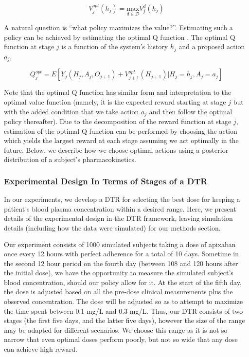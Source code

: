 \begin{equation}
V^{opt}_j(h_j) = \underset{d \in \mathscr{D}}{\mbox{max}} V^d_j(h_j)
\end{equation}

\noindent A natural question is “what policy maximizes the value?”. Estimating such a policy can be achieved by estimating the optimal Q function \cite{chakraborty2013statistical}.  The optimal Q function at stage $ j $ is a function of the system’s history $ h_j $ and a proposed action $ a_j $,

\begin{equation}
 Q_j^{opt} = E \left[ 
 Y_j(H_j, A_j, O_{j+1}) + V^{opt}_{j+1}(H_{j+1}) \lvert H_j = h_j, A_j = a_j
 \right]
\end{equation}

Note that the optimal Q function has similar form and interpretation to the optimal value function (namely, it is the expected reward starting at stage $ j $ but with the added condition that we take action $ a_j $ and then follow the optimal policy thereafter). Due to the decomposition of the reward function at stage $ j $, estimation of the optimal Q function can be performed by choosing the action which yields the largest reward at each stage assuming we act optimally in the future.  Below, we describe how we choose optimal actions using a posterior distribution of a subject’s pharmacokinetics.

\subsubsection{Experimental Design In Terms of Stages of a DTR}

In our experiments, we develop a DTR for selecting the best dose for keeping a patient’s blood plasma concentration within a desired range. Here, we present details of the experimental design in the DTR framework, leaving simulation details (including how the data were simulated) for our methods section.

Our experiment consists of 1000 simulated subjects taking a dose of apixaban once every 12 hours with perfect adherence for a total of 10 days.  Sometime in the second 12 hour period on the fourth day (between 108 and 120 hours after the initial dose), we have the opportunity to measure  the simulated subject’s blood concentration, should our policy allow for it.  At the start of the fifth day, the dose is adjusted based on all the pre-dose clinical measurements plus the observed concentration. The dose will be adjusted so as to attempt to maximize the time spent between 0.1 mg/L and 0.3 mg/L. Thus, our DTR consists of two stages (the first five days, and the latter five days), however the size of the range may be adapted for different scenarios. We choose this range as it is not so narrow that even optimal doses perform poorly, but not so wide that any dose can achieve high reward. 

